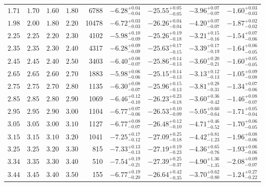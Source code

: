 \documentclass[a4paper,fleqn,usenatbib]{mnras}
\begin{document}
\begin{table*}
\begin{tabular}{ccccrcccc}
    $1.71$ & $1.70$ & $1.60$ & $1.80$ & 6788 & $-6.28^{+0.04}_{-0.04}$ & $-25.55^{+0.05}_{-0.05}$ & $-3.96^{+0.07}_{-0.07}$ & $-1.60^{+0.03}_{-0.03}$ \\
    $1.98$ & $2.00$ & $1.80$ & $2.20$ & 10478 & $-6.72^{+0.03}_{-0.03}$ & $-26.26^{+0.04}_{-0.04}$ & $-4.20^{+0.07}_{-0.07}$ & $-1.87^{+0.02}_{-0.02}$ \\
    $2.25$ & $2.25$ & $2.20$ & $2.30$ & 4102 & $-5.98^{+0.10}_{-0.09}$ & $-25.26^{+0.19}_{-0.18}$ & $-3.21^{+0.15}_{-0.16}$ & $-1.54^{+0.07}_{-0.06}$ \\
    $2.35$ & $2.35$ & $2.30$ & $2.40$ & 4317 & $-6.28^{+0.09}_{-0.09}$ & $-25.63^{+0.17}_{-0.15}$ & $-3.39^{+0.17}_{-0.19}$ & $-1.64^{+0.06}_{-0.05}$ \\
    $2.45$ & $2.45$ & $2.40$ & $2.50$ & 3403 & $-6.40^{+0.08}_{-0.07}$ & $-25.86^{+0.14}_{-0.13}$ & $-3.60^{+0.20}_{-0.21}$ & $-1.60^{+0.05}_{-0.05}$ \\
    $2.65$ & $2.65$ & $2.60$ & $2.70$ & 1883 & $-5.98^{+0.06}_{-0.06}$ & $-25.15^{+0.14}_{-0.13}$ & $-3.13^{+0.12}_{-0.13}$ & $-1.05^{+0.09}_{-0.08}$ \\
    $2.75$ & $2.75$ & $2.70$ & $2.80$ & 1135 & $-6.30^{+0.08}_{-0.07}$ & $-25.96^{+0.15}_{-0.13}$ & $-3.81^{+0.28}_{-0.31}$ & $-1.34^{+0.07}_{-0.06}$ \\
    $2.85$ & $2.85$ & $2.80$ & $2.90$ & 1069 & $-6.46^{+0.12}_{-0.10}$ & $-26.23^{+0.23}_{-0.18}$ & $-3.60^{+0.36}_{-0.42}$ & $-1.46^{+0.08}_{-0.07}$ \\
    $2.95$ & $2.95$ & $2.90$ & $3.00$ & 1104 & $-6.77^{+0.07}_{-0.06}$ & $-26.53^{+0.10}_{-0.09}$ & $-5.05^{+0.60}_{-0.64}$ & $-1.71^{+0.05}_{-0.04}$ \\
    $3.05$ & $3.05$ & $3.00$ & $3.10$ & 1127 & $-6.77^{+0.08}_{-0.07}$ & $-26.48^{+0.12}_{-0.10}$ & $-4.71^{+0.46}_{-0.52}$ & $-1.70^{+0.06}_{-0.05}$ \\
    $3.15$ & $3.15$ & $3.10$ & $3.20$ & 1041 & $-7.25^{+0.17}_{-0.12}$ & $-27.09^{+0.25}_{-0.18}$ & $-4.42^{+0.81}_{-1.23}$ & $-1.96^{+0.08}_{-0.06}$ \\
    $3.25$ & $3.25$ & $3.20$ & $3.30$ & 815 & $-7.33^{+0.13}_{-0.13}$ & $-27.19^{+0.19}_{-0.23}$ & $-4.36^{+0.65}_{-0.76}$ & $-1.93^{+0.06}_{-0.06}$ \\
    $3.34$ & $3.35$ & $3.30$ & $3.40$ & 510 & $-7.54^{+0.19}_{-0.21}$ & $-27.39^{+0.25}_{-0.37}$ & $-4.90^{+1.36}_{-1.35}$ & $-2.08^{+0.09}_{-0.07}$ \\
    $3.44$ & $3.45$ & $3.40$ & $3.50$ & 155 & $-6.77^{+0.19}_{-0.20}$ & $-26.64^{+0.42}_{-0.35}$ & $-3.70^{+0.62}_{-0.80}$ & $-1.24^{+0.27}_{-0.22}$ \\

\end{tabular}
\end{table*}
\end{document}
